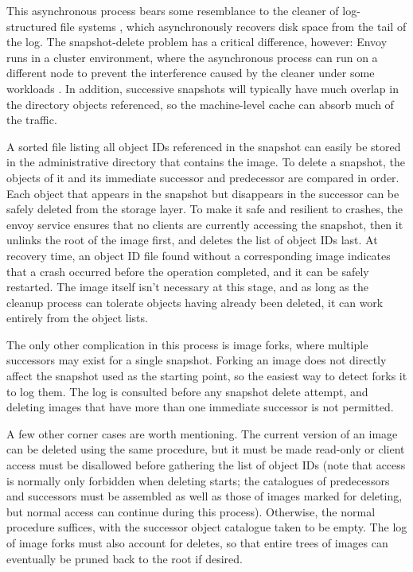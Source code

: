 This asynchronous process bears some resemblance to the cleaner of log-structured file systems \cite{rosenblum}, which asynchronously recovers disk space from the tail of the log. The snapshot-delete problem has a critical difference, however: Envoy runs in a cluster environment, where the asynchronous process can run on a different node to prevent the interference caused by the cleaner under some workloads \cite{seltzer93,seltzer95}. In addition, successive snapshots will typically have much overlap in the directory objects referenced, so the machine-level cache can absorb much of the traffic.

A sorted file listing all object IDs referenced in the snapshot can easily be stored in the administrative directory that contains the image. To delete a snapshot, the objects of it and its immediate successor and predecessor are compared in order. Each object that appears in the snapshot but disappears in the successor can be safely deleted from the storage layer. To make it safe and resilient to crashes, the envoy service ensures that no clients are currently accessing the snapshot, then it unlinks the root of the image first, and deletes the list of object IDs last. At recovery time, an object ID file found without a corresponding image indicates that a crash occurred before the operation completed, and it can be safely restarted. The image itself isn't necessary at this stage, and as long as the cleanup process can tolerate objects having already been deleted, it can work entirely from the object lists.

The only other complication in this process is image forks, where multiple successors may exist for a single snapshot. Forking an image does not directly affect the snapshot used as the starting point, so the easiest way to detect forks it to log them. The log is consulted before any snapshot delete attempt, and deleting images that have more than one immediate successor is not permitted.

A few other corner cases are worth mentioning. The current version of an image can be deleted using the same procedure, but it must be made read-only or client access must be disallowed before gathering the list of object IDs (note that access is normally only forbidden when deleting starts; the catalogues of predecessors and successors must be assembled as well as those of images marked for deleting, but normal access can continue during this process). Otherwise, the normal procedure suffices, with the successor object catalogue taken to be empty. The log of image forks must also account for deletes, so that entire trees of images can eventually be pruned back to the root if desired.

